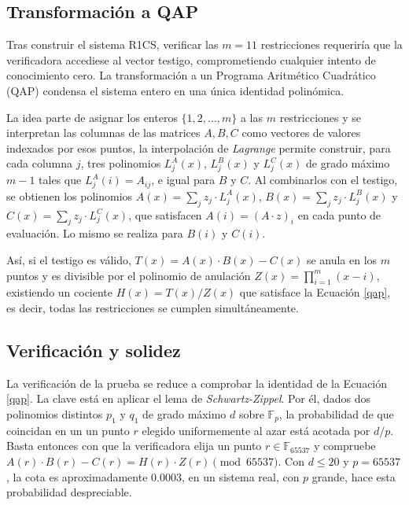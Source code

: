 \documentclass[a4paper, 11pt]{article}
\begin{document}
\subsection{Transformación a QAP} \label{poc_transformacion_qap}

Tras construir el sistema R1CS, verificar las $m = 11$ restricciones requeriría que la verificadora
accediese al vector testigo, comprometiendo cualquier intento de conocimiento cero. La transformación
a un Programa Aritmético Cuadrático (QAP) condensa el sistema entero en una única identidad polinómica.

La idea parte de asignar los enteros $\{1, 2, \ldots, m\}$ a las $m$ restricciones y se interpretan
las columnas de las matrices $A,B,C$ como vectores de valores indexados por esos puntos, la
interpolación de \textit{Lagrange} permite construir, para cada columna $j$, tres polinomios
$L_j^A(x)$, $L_j^B(x)$ y $L_j^C(x)$ de grado máximo $m-1$ tales que $L_j^A(i) = A_{ij}$, e igual para
$B$ y $C$. Al combinarlos con el testigo, se obtienen los polinomios $A(x) = \sum_{j} z_j \cdot L_j^A(x)$,
$B(x) = \sum_{j} z_j \cdot L_j^B(x)$ y $C(x) = \sum_{j} z_j \cdot L_j^C(x)$, que satisfacen
$A(i) = (A \cdot z)_i$ en cada punto de evaluación. Lo mismo se realiza para $B(i)$ y $C(i)$.

Así, si el testigo es válido, $T(x) = A(x) \cdot B(x) - C(x)$ se anula en los $m$ puntos y es
divisible por el polinomio de anulación $Z(x) = \prod_{i=1}^m (x - i)$, existiendo un cociente
$H(x) = T(x) / Z(x)$ que satisface la Ecuación \ref{qap}, es decir, todas las restricciones se
cumplen simultáneamente.

\subsection{Verificación y solidez} \label{poc_verificacion_solidez}

La verificación de la prueba se reduce a comprobar la identidad de la Ecuación \ref{qap}. La clave
está en aplicar el lema de \textit{Schwartz-Zippel}. Por él, dados dos polinomios distintos $p_1$ y
$q_1$ de grado máximo $d$ sobre $\mathbb{F}_p$, la probabilidad de que coincidan en un un punto $r$
elegido uniformemente al azar está acotada por $d/p$. Basta entonces con que la verificadora elija
un punto $r \in \mathbb{F}_{65537}$ y compruebe $A(r) \cdot B(r) - C(r) = H(r) \cdot Z(r) \pmod {65537}$.
Con $d \leq 20$ y $p = 65537$, la cota es aproximadamente $0.0003$, en un sistema real, con $p$ grande,
hace esta probabilidad despreciable.
\end{document}
